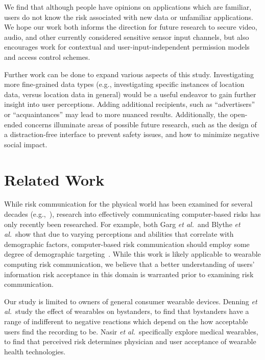 \documentclass[conference]{IEEEtran}
\begin{document}
We find that although people have opinions on applications which are familiar, users do not know the risk associated with new data or unfamiliar applications. We hope our work both informs the direction for future research to secure video, audio, and other currently considered sensitive sensor input channels, but also encourages work for contextual and user-input-independent permission models and access control schemes.

Further work can be done to expand various aspects of this study. Investigating more fine-grained data types (e.g., investigating specific instances of location data, versus location data in general) would be a useful endeavor to gain further insight into user perceptions. Adding additional recipients, such as ``advertisers'' or ``acquaintances'' may lead to more nuanced results. Additionally, the open-ended concerns illuminate areas of possible future research, such as the design of a distraction-free interface to prevent safety issues, and how to minimize negative social impact. 

\section{Related Work}
While risk communication for the physical world has been examined for several decades (e.g.,~\cite{slovic2000perception, Fischhoff,Morgan2001}), research into effectively communicating computer-based risks has only recently been researched. For example, both Garg {\it et al.}\ and Blythe {\it et al.}\ show that due to varying perceptions and abilities that correlate with demographic factors, computer-based risk communication should employ some degree of demographic targeting~\cite{Garg2012,Blythe2011}. While this work is likely applicable to wearable computing risk communication, we believe that a better understanding of users'  information risk acceptance in this domain is warranted prior to examining risk communication.

Our study is limited to owners of general consumer wearable devices. Denning {\it et al.}\ study the effect of wearables on bystanders, to find that bystanders have a range of indifferent to negative reactions which depend on the how acceptable users find the recording to be. Nasir {\it et al.}\ specifically explore medical wearables, to find that perceived risk determines physician and user acceptance of wearable health technologies. 
\end{document}
